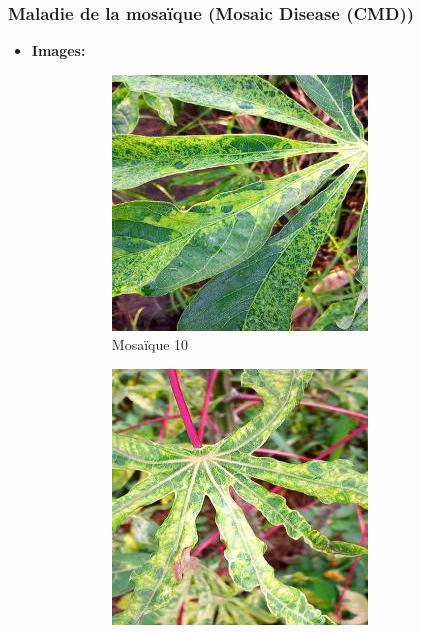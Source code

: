 \documentclass{article}
\begin{document}
	\newpage

	\subsubsection{Maladie de la mosaïque (Mosaic Disease (CMD))}
	\begin{itemize}
		\item \textbf{Images: }
		\begin{figure}[htbp]
			\centering
			\begin{subfigure}[b]{0.3\textwidth}
				\centering
				\includegraphics[width=\textwidth]{img/10.jpg}
				\caption{Mosaïque 10}
			\end{subfigure}
			\hfill
			\begin{subfigure}[b]{0.3\textwidth}
				\centering
				\includegraphics[width=\textwidth]{img/11.jpg}

\end{subfigure}
\end{figure}
\end{itemize}
\end{document}
